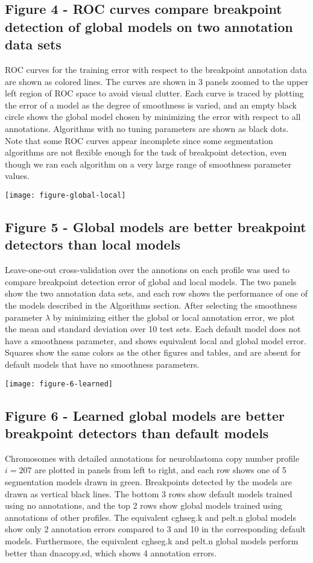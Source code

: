 \documentclass[10pt]{bmc_article}
\newenvironment{bmcformat}{\begin{raggedright}\baselineskip20pt\sloppy\setboolean{publ}{false}}{\end{raggedright}\baselineskip20pt\sloppy}
\begin{document}
\begin{bmcformat}
\subsection*{Figure 4 - ROC curves compare breakpoint detection of
  global models on two annotation data sets}
ROC curves for the training error with respect to the breakpoint
annotation data are shown as colored lines. The curves are shown in 3
panels zoomed to the upper left region of ROC space to avoid visual
clutter. Each curve is traced by plotting the error of a model as the
degree of smoothness is varied, and an empty black circle shows the
global model chosen by minimizing the error with respect to all
annotations. Algorithms with no tuning parameters are shown as black
dots. Note that some ROC curves appear incomplete since some
segmentation algorithms are not flexible enough for the task of
breakpoint detection, even though we ran each algorithm on a very
large range of smoothness parameter values.

\newpage
\texttt{[image: figure-global-local]}

\subsection*{Figure 5 - Global models are better breakpoint detectors
  than local models}

Leave-one-out cross-validation over the annotions on each profile was
used to compare breakpoint detection error of global and local
models. The two panels show the two annotation data sets, and each row
shows the performance of one of the models described in the Algorithms
section. After selecting the smoothness parameter $\lambda$ by
minimizing either the global or local annotation error, we plot the
mean and standard deviation over 10 test sets. Each default model does
not have a smoothness parameter, and shows equivalent local and global
model error. Squares show the same colors as the other figures and
tables, and are absent for default models that have no smoothness
parameters.

\newpage

\texttt{[image: figure-6-learned]}

\subsection*{Figure 6 - Learned global models are better breakpoint
  detectors than default models}
Chromosomes with detailed annotations for neuroblastoma copy number
profile $i=207$ are plotted in panels from left to right, and each row
shows one of 5 segmentation models drawn in green. Breakpoints
detected by the models are drawn as vertical black lines. The bottom 3
rows show default models trained using no annotations, and the top 2
rows show global models trained using annotations of other
profiles. The equivalent cghseg.k and pelt.n global models show only 2
annotation errors compared to 3 and 10 in the corresponding default
models. Furthermore, the equivalent cghseg.k and pelt.n global models
perform better than dnacopy.sd, which shows 4 annotation errors.


\end{bmcformat}
\end{document}
